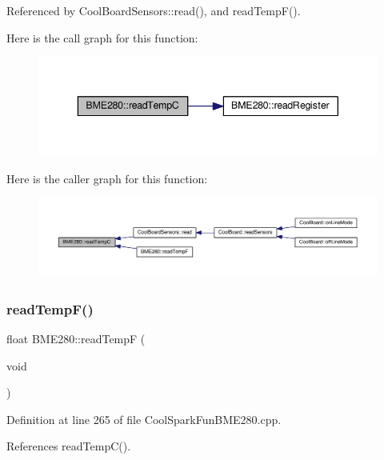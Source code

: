 Referenced by Cool\+Board\+Sensors\+::read(), and read\+Temp\+F().

Here is the call graph for this function\+:
\nopagebreak
\begin{figure}[H]
\begin{center}
\leavevmode
\includegraphics[width=343pt]{df/dcf/class_b_m_e280_afffdd1d7ded9e1f92200e70669019d97_cgraph}
\end{center}
\end{figure}
Here is the caller graph for this function\+:
\nopagebreak
\begin{figure}[H]
\begin{center}
\leavevmode
\includegraphics[width=350pt]{df/dcf/class_b_m_e280_afffdd1d7ded9e1f92200e70669019d97_icgraph}
\end{center}
\end{figure}
\mbox{\label{class_b_m_e280_a9648b496f6b4700550782a715a98b3c7}} 
\subsubsection{\texorpdfstring{read\+Temp\+F()}{readTempF()}}
{\footnotesize\ttfamily float B\+M\+E280\+::read\+TempF (\begin{DoxyParamCaption}\item[{void}]{ }\end{DoxyParamCaption})}



Definition at line 265 of file Cool\+Spark\+Fun\+B\+M\+E280.\+cpp.



References read\+Temp\+C().

